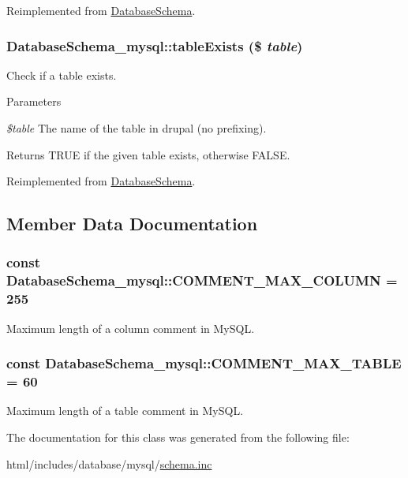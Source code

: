 Reimplemented from \hyperlink{classDatabaseSchema_aaa0b6f32797505bdfc9ed953e10a486e}{DatabaseSchema}.\hypertarget{classDatabaseSchema__mysql_a3590c4ea18bb4d950f1595370f4ae211}{
\subsubsection[{tableExists}]{\setlength{\rightskip}{0pt plus 5cm}DatabaseSchema\_\-mysql::tableExists (\$ {\em table})}}
\label{classDatabaseSchema__mysql_a3590c4ea18bb4d950f1595370f4ae211}
Check if a table exists.


\begin{DoxyParams}{Parameters}
\item[{\em \$table}]The name of the table in drupal (no prefixing).\end{DoxyParams}
\begin{DoxyReturn}{Returns}
TRUE if the given table exists, otherwise FALSE. 
\end{DoxyReturn}


Reimplemented from \hyperlink{classDatabaseSchema_acf4650f58bed6fc76d94d49a72e5d706}{DatabaseSchema}.

\subsection{Member Data Documentation}
\hypertarget{classDatabaseSchema__mysql_a67b97924e20b8db8df46f05dcc8e6a1d}{
\subsubsection[{COMMENT\_\-MAX\_\-COLUMN}]{\setlength{\rightskip}{0pt plus 5cm}const {\bf DatabaseSchema\_\-mysql::COMMENT\_\-MAX\_\-COLUMN} = 255}}
\label{classDatabaseSchema__mysql_a67b97924e20b8db8df46f05dcc8e6a1d}
Maximum length of a column comment in MySQL. \hypertarget{classDatabaseSchema__mysql_a4d02578a95eabfb2de66accd1b3e8860}{
\subsubsection[{COMMENT\_\-MAX\_\-TABLE}]{\setlength{\rightskip}{0pt plus 5cm}const {\bf DatabaseSchema\_\-mysql::COMMENT\_\-MAX\_\-TABLE} = 60}}
\label{classDatabaseSchema__mysql_a4d02578a95eabfb2de66accd1b3e8860}
Maximum length of a table comment in MySQL. 

The documentation for this class was generated from the following file:\begin{DoxyCompactItemize}
\item 
html/includes/database/mysql/\hyperlink{mysql_2schema_8inc}{schema.inc}\end{DoxyCompactItemize}
